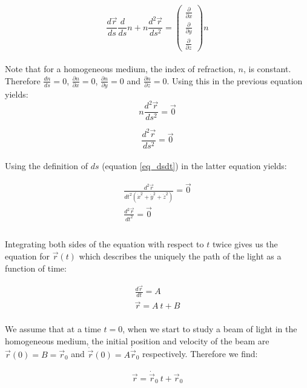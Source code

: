 \documentclass{article}
\def\Nabla{
	\begin{pmatrix}
		\frac{\partial}{\partial {x}} \\
		\frac{\partial}{\partial {y}} \\
		\frac{\partial}{\partial {z}}
	\end{pmatrix}}
\begin{document}
\begin{equation*}
	\frac{d \vec{r}}{ds} \frac{d}{ds} n + n \frac{d^2 \vec{r}}{ds^2} = \Nabla n
\end{equation*} \\

Note that for a homogeneous medium, the index of refraction, $n$, is constant. Therefore $\frac{dn}{ds} = 0$, $\frac{\partial n}{\partial x} = 0$, $\frac{\partial n}{\partial y} = 0$ and $\frac{\partial n}{\partial z} = 0$. Using this in the previous equation yields: \\

\begin{equation*}
	 n \frac{d^2 \vec{r}}{ds^2} = \vec{0}
\end{equation*}

\begin{equation*}
	 \frac{d^2 \vec{r}}{ds^2} = \vec{0}
\end{equation*} \\

Using the definition of $ds$ (equation \ref{eq_dsdt}) in the latter equation yields:

\begin{align*}
	 \frac{d^2 \vec{r}}{dt^2 (\dot{x}^2+\dot{y}^2+\dot{z}^2)} = \vec{0} \\
	 \frac{d^2 \vec{r}}{dt^2} = \vec{0} \\ 
\end{align*} \\

Integrating both sides of the equation with respect to $t$ twice gives us the equation for $\vec{r}(t)$ which describes the uniquely the path of the light as a function of time:

\begin{align*}
	 \frac{d \vec{r}}{dt} = A \\
	 \vec{r} = A \: t + B
\end{align*} \\

We assume that at a time $t=0$, when we start to study a beam of light in the homogeneous medium, the initial position and velocity of the beam are $\vec{r}(0) = B = \vec{r}_0$ and  $ \dot{\vec{r}}(0) = A  \dot{\vec{r}}_0$ respectively. Therefore we find:

\begin{align*}
	 \vec{r} = \dot{\vec{r}}_0 \: t + \vec{r}_0
\end{align*} \\
\end{document}
